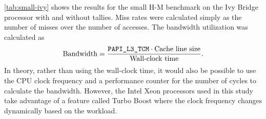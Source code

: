 \documentclass{mc2015}
\begin{document}
\autoref{tab:small-ivy} shows the results for the small H-M benchmark on the
Ivy Bridge processor with and without tallies. Miss rates were calculated
simply as the number of misses over the number of accesses. The bandwidth
utilization was calculated as~\cite{physor-tramm-2014}
\begin{equation}
  \label{eq:bandwidth}
  \text{Bandwidth} = \frac{\text{\texttt{PAPI\_L3\_TCM}}\cdot\text{Cache line
      size}}{\text{Wall-clock time}}.
\end{equation}
In theory, rather than using the wall-clock time, it would also be possible to
use the CPU clock frequency and a performance counter for the number of cycles
to calculate the bandwidth. However, the Intel Xeon processors used in this
study take advantage of a feature called Turbo Boost where the clock frequency
changes dynamically based on the workload.
\end{document}
